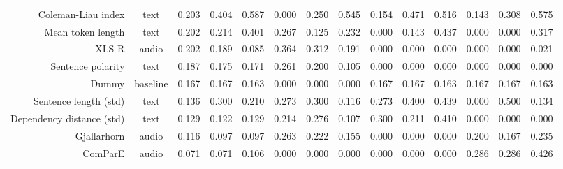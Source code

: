 \begin{tabular}{rc||ccc||ccc||ccc||ccc}
                     Coleman-Liau index &     text &              0.203 &      0.404 & 0.587 &    0.000 &      0.250 & 0.545 &     0.154 &      0.471 & 0.516 &     0.143 &      0.308 & 0.575 \\
                      Mean token length &     text &              0.202 &      0.214 & 0.401 &    0.267 &      0.125 & 0.232 &     0.000 &      0.143 & 0.437 &     0.000 &      0.000 & 0.317 \\
                                  XLS-R &    audio &              0.202 &      0.189 & 0.085 &    0.364 &      0.312 & 0.191 &     0.000 &      0.000 & 0.000 &     0.000 &      0.000 & 0.021 \\
                      Sentence polarity &     text &              0.187 &      0.175 & 0.171 &    0.261 &      0.200 & 0.105 &     0.000 &      0.000 & 0.000 &     0.000 &      0.000 & 0.000 \\
                                  Dummy & baseline &              0.167 &      0.167 & 0.163 &    0.000 &      0.000 & 0.000 &     0.167 &      0.167 & 0.163 &     0.167 &      0.167 & 0.163 \\
                  Sentence length (std) &     text &              0.136 &      0.300 & 0.210 &    0.273 &      0.300 & 0.116 &     0.273 &      0.400 & 0.439 &     0.000 &      0.500 & 0.134 \\
              Dependency distance (std) &     text &              0.129 &      0.122 & 0.129 &    0.214 &      0.276 & 0.107 &     0.300 &      0.211 & 0.410 &     0.000 &      0.000 & 0.000 \\
                            Gjallarhorn &    audio &              0.116 &      0.097 & 0.097 &    0.263 &      0.222 & 0.155 &     0.000 &      0.000 & 0.000 &     0.200 &      0.167 & 0.235 \\
                                ComParE &    audio &              0.071 &      0.071 & 0.106 &    0.000 &      0.000 & 0.000 &     0.000 &      0.000 & 0.000 &     0.286 &      0.286 & 0.426 \\
\bottomrule
\end{tabular}
